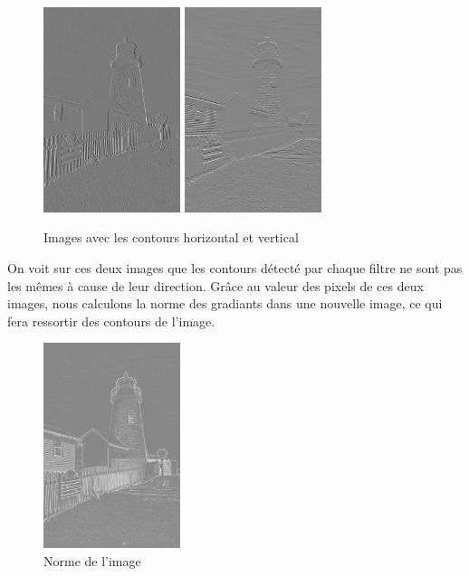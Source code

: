 \documentclass[a4paper,11pt]{article}
\begin{document}
  \begin{figure}[H]
  \center
   \includegraphics[width=4cm]{../lighthouse_8bits_grad_x.png}
   \includegraphics[width=4cm]{../lighthouse_8bits_grad_y.png}
   \caption{Images avec les contours horizontal et vertical}
  \end{figure}

  On voit sur ces deux images que les contours détecté par chaque filtre ne sont pas les mêmes
  à cause de leur direction. Grâce au valeur des pixels de ces deux images, nous calculons la norme
  des gradiants dans une nouvelle image, ce qui fera ressortir des contours de l'image.

  \begin{figure}[H]
  \center
   \includegraphics[width=4cm]{../norme32.png}
   \caption{Norme de l'image}
  \end{figure}
  
\end{document}
